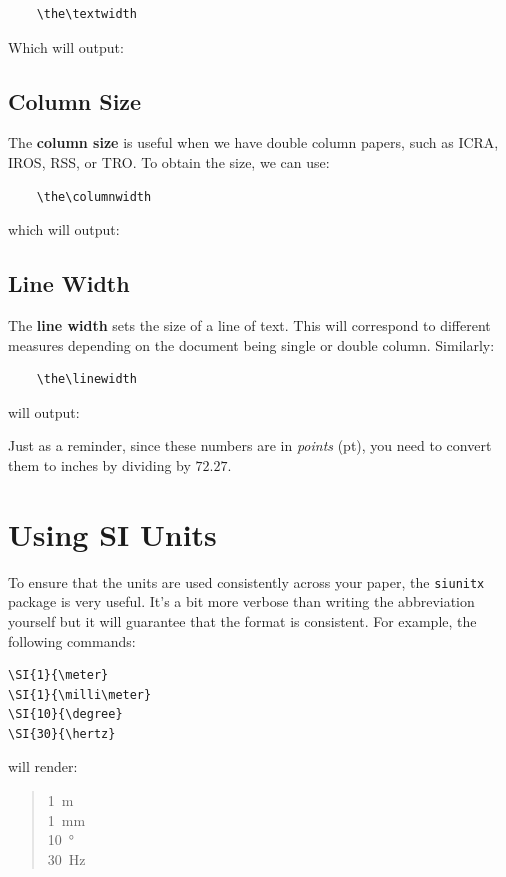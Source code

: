 \documentclass[letterpaper, 10 pt, conference]{ieeeconf}  %
\newlength\Size
\begin{document}
\begin{verbatim}
    \the\textwidth
\end{verbatim}
Which will output:
%
\begin{quotation}
\the\textwidth
\end{quotation}

\subsection{Column Size}
The \textbf{column size} is useful when we have double column papers, such as ICRA, IROS, RSS, or TRO. To obtain the size, we can use:
\begin{verbatim}
    \the\columnwidth
\end{verbatim}
which will output:
%
\begin{quotation}
\the\columnwidth
\end{quotation}

\subsection{Line Width}
The \textbf{line width} sets the size of a line of text. This will correspond to different measures depending on the document being single or double column. Similarly:
\begin{verbatim}
    \the\linewidth
\end{verbatim}
will output:
%
\begin{quotation}
    \the\linewidth
\end{quotation}

Just as a reminder, since these numbers are in \emph{points} (pt), you need to convert them to inches by dividing by $72.27$.

\section{Using SI Units}
To ensure that the units are used consistently across your paper, the \texttt{siunitx} package is very useful. It's a bit more verbose than writing the abbreviation yourself but it will guarantee that the format is consistent. For example, the following commands:

\begin{verbatim}
\SI{1}{\meter}
\SI{1}{\milli\meter}
\SI{10}{\degree}
\SI{30}{\hertz}
\end{verbatim}
will render:

\begin{quotation}
\noindent\SI{1}{\meter}\\
\SI{1}{\milli\meter}\\
\SI{10}{\degree}\\
\SI{30}{\hertz}\\
\end{quotation}
\end{document}
